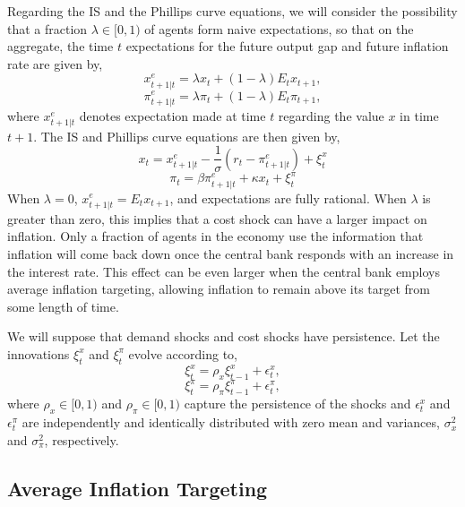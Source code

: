 \documentclass[12pt]{article}
\begin{document}
Regarding the IS and the Phillips curve equations, we will consider the possibility that a fraction $\lambda \in [0,1)$ of agents form naive expectations, so that on the aggregate, the time $t$ expectations for the future output gap and future inflation rate are given by,
\begin{equation}\label{eq:xe}
  x_{t+1|t}^e = \lambda x_t + (1-\lambda) E_t x_{t+1},
\end{equation}
\begin{equation}\label{eq:pie}
  \pi_{t+1|t}^e = \lambda \pi_t + (1-\lambda) E_t \pi_{t+1},
\end{equation}
where $x_{t+1|t}^e$ denotes expectation made at time $t$ regarding the value $x$ in time $t+1$. The IS and Phillips curve equations are then given by,
\begin{equation}\label{eq:ISe}
  x_t = x_{t+1|t}^e - \frac{1}{\sigma} \left( r_t - \pi_{t+1|t}^e \right) + \xi_t^{x}
\end{equation}
\begin{equation}\label{eq:PhillipsCurvee}
  \pi_t = \beta \pi_{t+1|t}^e + \kappa x_t + \xi_t^{\pi}
\end{equation}
When $\lambda=0$, $x_{t+1|t}^e = E_t x_{t+1}$, and expectations are fully rational. When $\lambda$ is greater than zero, this implies that a cost shock can have a larger impact on inflation. Only a fraction of agents in the economy use the information that inflation will come back down once the central bank responds with an increase in the interest rate. This effect can be even larger when the central bank employs average inflation targeting, allowing inflation to remain above its target from some length of time.

We will suppose that demand shocks and cost shocks have persistence. Let the innovations $\xi_t^x$ and $\xi_t^\pi$ evolve according to,
\begin{equation}\label{eq:demandshock}
  \xi_t^x = \rho_x \xi_{t-1}^x + \epsilon_t^x,
\end{equation}
\begin{equation}\label{eq:costshock}
  \xi_t^\pi = \rho_\pi \xi_{t-1}^\pi + \epsilon_t^\pi,
\end{equation}
where $\rho_x\in [0,1)$ and $\rho_\pi \in [0,1)$ capture the persistence of the shocks and $\epsilon_t^x$ and $\epsilon_t^\pi$ are independently and identically distributed with zero mean and variances, $\sigma_x^2$ and $\sigma_\pi^2$, respectively.

\subsection{Average Inflation Targeting}
\end{document}
